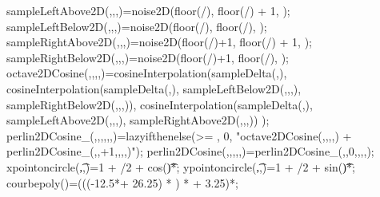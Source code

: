 \documentclass[hyperref={pdfpagelabels=false}]{beamer}
\begin{document}
{{    sampleLeftAbove2D(\x,\y,\periode,\octave)=noise2D(floor(\x/\periode), floor(\y/\periode) + 1, \octave);
    sampleLeftBelow2D(\x,\y,\periode,\octave)=noise2D(floor(\x/\periode), floor(\y/\periode), \octave);
    sampleRightAbove2D(\x,\y,\periode,\octave)=noise2D(floor(\x/\periode)+1, floor(\y/\periode) + 1, \octave);
    sampleRightBelow2D(\x,\y,\periode,\octave)=noise2D(floor(\x/\periode)+1, floor(\y/\periode), \octave);
    octave2DCosine(\x,\y,\octave,\periode,\amplitude)=\amplitude*cosineInterpolation(sampleDelta(\y,\periode),
    cosineInterpolation(sampleDelta(\x,\periode), sampleLeftBelow2D(\x,\y,\periode,\octave), sampleRightBelow2D(\x,\y,\periode,\octave)),
    cosineInterpolation(sampleDelta(\x,\periode), sampleLeftAbove2D(\x,\y,\periode,\octave), sampleRightAbove2D(\x,\y,\periode,\octave))
    );
    perlin2DCosine_(\x,\y,\octave,\periode,\octaves,\persistance,\amplitude)=lazyifthenelse(\octave >= \octaves, 0, "octave2DCosine(\x,\y,\octave,\periode,\amplitude) + perlin2DCosine_(\x,\y,\octave+1,,\octaves,\persistance,\amplitude*\persistance)");
    perlin2DCosine(\x,\y,\periode,\octaves,\persistance,\amplitude)=perlin2DCosine_(\x,\y,0,\periode,\octaves,\persistance,\amplitude);
    xpointoncircle(\t,\circler,\maxdiam)=1 + \maxdiam/2 + cos(\t)*\circler;
    ypointoncircle(\t,\circler,\maxdiam)=1 + \maxdiam/2 + sin(\t)*\circler;
    courbepoly(\x)=(((-12.5*\x + 26.25) * ) * \x + 3.25)*\x;
  }
}
\end{document}

